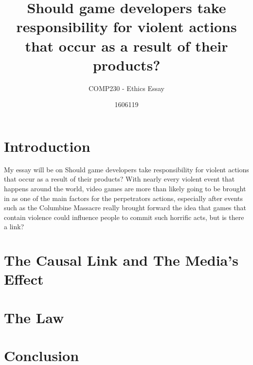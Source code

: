 \documentclass{scrartcl}
\title{Should game developers take responsibility for violent actions that occur as a result of their products?}
\subtitle{COMP230 - Ethics Essay}
\author{1606119}
\begin{document}
\maketitle

\abstract{} 

\section{Introduction}
My essay will be on Should game developers take responsibility for violent actions that occur as a result of their products? With nearly every violent event that happens around the world, video games are more than likely going to be brought in as one of the main factors for the perpetrators actions, especially after events such as the Columbine Massacre really brought forward the idea that games that contain violence could influence people to commit such horrific acts, but is there a link? 

\section{The Causal Link and The Media's Effect}



\section{The Law}



\section{Conclusion}










\end{document}
